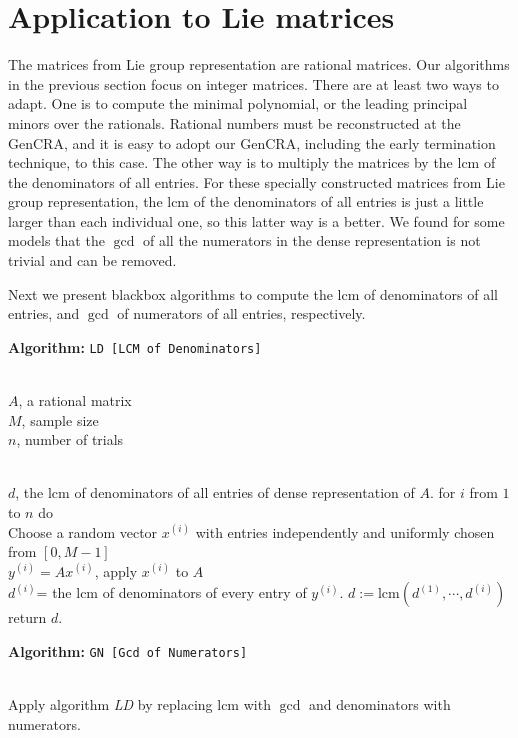 \documentclass{acm_proc_article-sp}
\makeatletter
\newlength{\Stmtindent}
\newenvironment{algorithm}[1]
{
   \setlength{\Stmtindent}{10pt}
   \def\Stmt{\@ifnextchar[{\@Stmt}{\@Stmt[]}}
   \def\@Stmt[##1]{\par\hspace*{\Stmtindent}\llap{##1\enspace\hfil}%
                   \hangindent\Stmtindent\ignorespaces}
   \def\Inspec{\par\hangindent0pt\noindent%
               \rlap{\@alginheader}\gdef\@alginheader{}%
               \hangindent1.0\Stmtindent\ignorespaces}
   \def\Outspec{\par\hangindent0pt\noindent%
                \rlap{\@algoutheader}\gdef\@algoutheader{}%
                \hangindent1.0\Stmtindent\ignorespaces}
   \def\Procspec{\par\hangindent0pt\noindent%
                \rlap{\@algprocheader}\gdef\@algprocheader{}%
                \hangindent1.0\Stmtindent\ignorespaces
				}
   \def\>{\advance\hangindent\Stmtindent\hspace*{\Stmtindent}\ignorespaces}
   \def\@alginheader{Input:}
   \def\@algoutheader{Output:}
   \def\@algprocheader{Method:}

   \parindent=0pt
   \parskip=1pt

   \medbreak\par {\bf Algorithm: }{\tt #1}
}
{\smallbreak}
\newcommand{\lcm}{\ensuremath{\mbox{lcm}}}
\makeatother
\begin{document}
\section {Application to Lie matrices}
The matrices from Lie group representation are rational matrices.
Our algorithms in the previous section focus on integer matrices.
There are at least two ways to adapt.
One is to compute the minimal polynomial, or the leading principal minors
over the rationals.
Rational numbers must be reconstructed at the GenCRA,
and it is easy to adopt our GenCRA, including the early termination technique,
to this case.
The other way is to multiply the matrices by the $\lcm$ of
the denominators of all entries.
For these specially constructed matrices from Lie group representation, 
the $\lcm$ of the denominators of all entries
is just a little larger than each individual one,
so this latter way is a better.
We found for some models that the $\gcd$ of all the
numerators in the dense representation is not trivial and  can be removed.

Next we present blackbox algorithms to compute the
$\lcm$ of denominators of all entries, 
and $\gcd$ of numerators of all entries,
respectively.
\begin{algorithm} {LD [LCM of Denominators]}
\Inspec \\
$A$, a rational matrix\\
$M$, sample size\\
$n$, number of trials
\Outspec \\
$d$, the $\lcm$ of denominators of all entries of dense representation of $A$.
\Stmt[1.]
for $i$ from $1$ to $n$ do\\
Choose a random vector $x^{(i)}$ with entries independently and uniformly chosen
from $[0, M-1]$\\
$y^{(i)} = A x^{(i)}$, apply $x^{(i)}$ to $A$\\
$d^{(i)}$= the $\lcm$ of denominators of every entry of $y^{(i)}$.
\Stmt[2.]
$d := \lcm (d^{(1)}, \cdots, d^{(i)})$
\Stmt[3.]
return $d$.
\end{algorithm}

\begin{algorithm}{GN [Gcd of Numerators]}
\\Apply algorithm {\em LD} by replacing $\lcm$ with $\gcd$ and 
denominators with numerators.
\end{algorithm}
\end{document}
